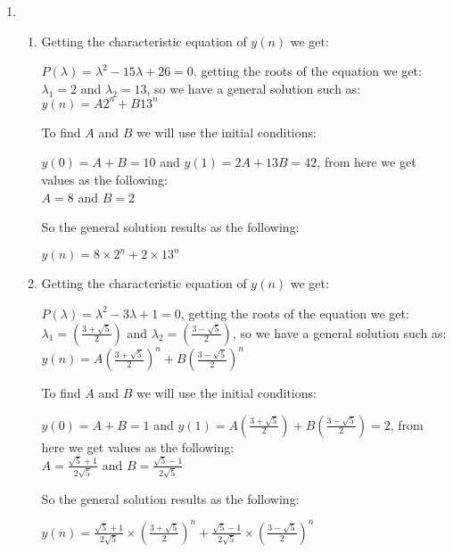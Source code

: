 \documentclass[10pt,a4paper, margin=1in]{article}
\begin{document}
\begin{enumerate}
\item 
    \begin{enumerate}
    \item
   	Getting the characteristic equation of $y(n)$ we get:
   	\begin{center}
   	$P(\lambda)=\lambda^2-15\lambda+26=0$, getting the roots of the equation we get: \\
   	$\lambda_1=2$ and $\lambda_2=13$, so we have a general solution such as: \\
   	$y(n)=A2^{n}+B13^{n}$
   	\end{center}
   	To find $A$ and $B$ we will use the initial conditions: 
   	\begin{center}
   	$y(0)=A+B=10$ and $y(1)=2A+13B=42$, from here we get values as the following: \\
   	$A=8$ and $B=2$
   	\end{center}
   	So the general solution results as the following: \\
   	\begin{center}
   	$y(n)=8\times 2^{n}+2\times 13^{n}$
   	\end{center}
    \item
    Getting the characteristic equation of $y(n)$ we get:
   	\begin{center}
   	$P(\lambda)=\lambda^2-3\lambda+1=0$, getting the roots of the equation we get: \\
   	$\lambda_1=(\frac{3+\sqrt{5}}{2})$ and $\lambda_2=(\frac{3-\sqrt{5}}{2})$, so we have a general solution such as: \\
   	$y(n)=A(\frac{3+\sqrt{5}}{2})^{n}+B(\frac{3-\sqrt{5}}{2})^{n}$
   	\end{center}
   	To find $A$ and $B$ we will use the initial conditions: 
   	\begin{center}
   	$y(0)=A+B=1$ and $y(1)=A(\frac{3+\sqrt{5}}{2})+B(\frac{3-\sqrt{5}}{2})=2$, from here we get values as the following: \\
   	$A=\frac{\sqrt{5}+1}{2\sqrt{5}}$ and $B=\frac{\sqrt{5}-1}{2\sqrt{5}}$
   	\end{center}
   	So the general solution results as the following: \\
   	\begin{center}
   	$y(n)=\frac{\sqrt{5}+1}{2\sqrt{5}} \times (\frac{3+\sqrt{5}}{2})^{n}+ \frac{\sqrt{5}-1}{2\sqrt{5}} \times (\frac{3-\sqrt{5}}{2})^{n}$
   	\end{center}
    \end{enumerate}
    

\end{enumerate}
\end{document}

